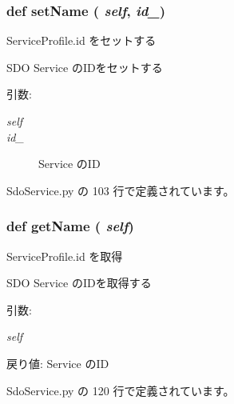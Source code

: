 \subsubsection{\setlength{\rightskip}{0pt plus 5cm}def setName ( {\em self},  {\em id\_\-})}\label{classsource__py_1_1_sdo_service_1_1_s_d_o_service_profile_7353c2f35c0cfe24ff85fdeb1a6d1835}


ServiceProfile.id をセットする 

SDO Service のIDをセットする

\begin{Desc}
\item[引数:]
\begin{description}
\item[{\em self}]\item[{\em id\_\-}]Service のID \end{description}
\end{Desc}


 SdoService.py の 103 行で定義されています。
\subsubsection{\setlength{\rightskip}{0pt plus 5cm}def getName ( {\em self})}\label{classsource__py_1_1_sdo_service_1_1_s_d_o_service_profile_a20eb4733f75b094213b8cfd614fa526}


ServiceProfile.id を取得 

SDO Service のIDを取得する

\begin{Desc}
\item[引数:]
\begin{description}
\item[{\em self}]\end{description}
\end{Desc}
\begin{Desc}
\item[戻り値:]Service のID \end{Desc}


 SdoService.py の 120 行で定義されています。
